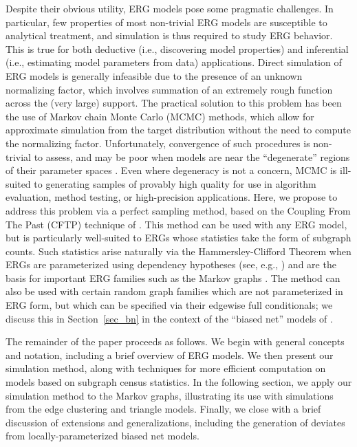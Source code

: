 \documentclass[11pt]{article}
\begin{document}
Despite their obvious utility, ERG models pose some pragmatic challenges.  In particular, few  properties of most non-trivial ERG models are susceptible to analytical treatment, and simulation is thus required to study ERG behavior.  This is true for both deductive (i.e., discovering model properties) and inferential (i.e., estimating model parameters from data) applications.  Direct simulation of ERG models is generally infeasible due to the presence of an unknown normalizing factor, which involves summation of an extremely rough function across the (very large) support.  The practical solution to this problem has been the use of Markov chain Monte Carlo (MCMC) methods, which allow for approximate simulation from the target distribution without the need to compute the normalizing factor.  Unfortunately, convergence of such procedures is non-trivial to assess, and may be poor when models are near the ``degenerate'' regions of their parameter spaces \citep{strauss:siam:1986,snijders:joss:2002,handcock:ch:2003,bhamidi.et.al:aap:2011}.  Even where degeneracy is not a concern, MCMC is ill-suited to generating samples of provably high quality for use in algorithm evaluation, method testing, or high-precision applications.  Here, we propose to address this problem via a perfect sampling method, based on the Coupling From The Past (CFTP) technique of \citet{propp.wilson:rsa:1996}.  This method can be used with any ERG model, but is particularly well-suited to ERGs whose statistics take the form of subgraph counts.  Such statistics arise naturally via the Hammersley-Clifford Theorem \citep{besag:jrssB:1974} when ERGs are parameterized using dependency hypotheses (see, e.g., \citet{pattison.robins:sm:2002,wasserman.robins:ch:2005}) and are the basis for important ERG families such as the Markov graphs \citep{frank.strauss:jasa:1986}.  The method can also be used with certain random graph families which are not parameterized in ERG form, but which can be specified via their edgewise full conditionals; we discuss this in Section~\ref{sec_bn} in the context of the ``biased net'' models of \citet{rapoport:bmb:1949a,rapoport:bmb:1949b,rapoport:bmb:1950}.

The remainder of the paper proceeds as follows.  We begin with general concepts and notation, including a brief overview of ERG models.  We then present our simulation method, along with techniques for more efficient computation on models based on subgraph census statistics.  In the following section, we apply our simulation method to the Markov graphs, illustrating its use with simulations from the edge clustering and triangle models.  Finally, we close with a brief discussion of extensions and generalizations, including the generation of deviates from locally-parameterized biased net models.
\end{document}
